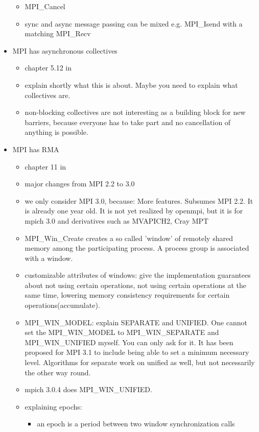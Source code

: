 \documentclass[a4paper, 10pt]{article}
\begin{document}
\begin{itemize}
\begin{itemize}
			\item MPI\_Cancel
			\item sync and async message passing can be mixed e.g. MPI\_Isend with a matching MPI\_Recv
		\end{itemize}
	\item MPI has asynchronous collectives
		\begin{itemize}
			\item chapter 5.12 in \cite{mpi3}
			\item explain shortly what this is about. Maybe you need to explain what collectives are.
			\item non-blocking collectives are not interesting as a building block for new barriers, because everyone has to take part and no cancellation of anything is possible.
		\end{itemize}
	\item MPI has RMA
		\begin{itemize}
			\item chapter 11 in \cite{mpi3}
			\item major changes from MPI 2.2\cite{mpi2} to 3.0\cite{mpi3onesided}
			\item we only consider MPI 3.0, because: More features. Subsumes MPI 2.2. It is already one year old. It is not yet realized by openmpi, but it is for mpich 3.0 and derivatives such as MVAPICH2\cite{mvapich}, Cray MPT\cite{craympt}
			\item MPI\_Win\_Create creates a so called 'window' of remotely shared memory among the participating process. A process group is associated with a window.
			\item customizable attributes of windows: give the implementation guarantees about not using certain operations, not using certain operations at the same time, lowering memory consistency requirements for certain operations(accumulate).
			\item MPI\_WIN\_MODEL: explain SEPARATE and UNIFIED. One cannot set the MPI\_WIN\_MODEL to MPI\_WIN\_SEPARATE and MPI\_WIN\_UNIFIED myself. You can only ask for it. It has been proposed for MPI 3.1 to include being able to set a minimum necessary level. Algorithms for separate work on unified as well, but not necessarily the other way round.
			\item mpich 3.0.4 does MPI\_WIN\_UNIFIED.
			\item explaining epochs:
				\begin{itemize}
					\item an epoch is a period between two window synchronization calls

\end{itemize}
\end{itemize}
\end{itemize}
\end{document}
